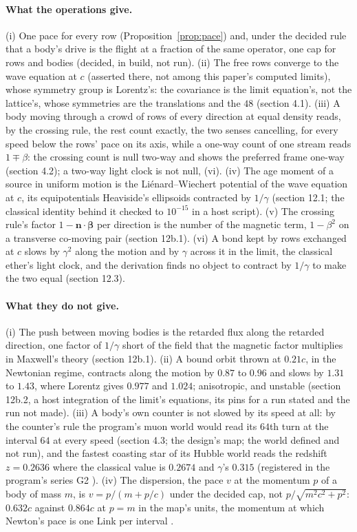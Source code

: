\documentclass[11pt]{article}
\theoremstyle{definition}
\begin{document}
\paragraph{What the operations give.} (i) One pace for every row
(Proposition~\ref{prop:pace}) and, under the decided rule that a body's
drive is the flight at a fraction of the same operator, one cap for rows
and bodies (decided, in build, not run). (ii) The free rows converge to
the wave equation at $c$ (asserted there, not among this paper's computed
limits), whose symmetry group is Lorentz's: the covariance is the limit
equation's, not the lattice's, whose symmetries are the translations and
the $48$ (section 4.1). (iii) A body moving through a crowd of rows of
every direction at equal density reads, by the crossing rule, the rest
count exactly, the two senses cancelling, for every speed below the rows'
pace on its axis, while a one-way count of one stream reads $1 \mp
\beta$: the crossing count is null two-way and shows the preferred frame
one-way (section 4.2); a two-way light clock is not null, (vi). (iv) The
age moment of a source in uniform motion is the Li\'enard--Wiechert
potential of the wave equation at $c$, its equipotentials Heaviside's
ellipsoids contracted by $1/\gamma$ (section 12.1; the classical identity
behind it checked to $10^{-15}$ in a host script). (v) The crossing
rule's factor $1 - \mathbf n \cdot \boldsymbol\beta$ per direction is the
number of the magnetic term, $1 - \beta^2$ on a transverse co-moving pair
(section 12b.1). (vi) A bond kept by rows exchanged at $c$ slows by
$\gamma^2$ along the motion and by $\gamma$ across it in the limit, the
classical ether's light clock, and the derivation finds no object to
contract by $1/\gamma$ to make the two equal (section 12.3).

\paragraph{What they do not give.} (i) The push between moving bodies is
the retarded flux along the retarded direction, one factor of $1/\gamma$
short of the field that the magnetic factor multiplies in Maxwell's
theory (section 12b.1). (ii) A bound orbit thrown at $0.21c$, in the
Newtonian regime, contracts along the motion by $0.87$ to $0.96$ and
slows by $1.31$ to $1.43$, where Lorentz gives $0.977$ and $1.024$;
anisotropic, and unstable (section 12b.2, a host integration of the
limit's equations, its pins for a run stated and the run not made).
(iii) A body's own counter is not slowed by its speed at all: by the
counter's rule the program's muon world would read its $64$th turn at the
interval $64$ at every speed (section 4.3; the design's map; the world
defined and not run), and the fastest coasting star of its Hubble world
reads the redshift $z = 0.2636$ where the classical value is $0.2674$ and $\gamma$'s
$0.315$ (registered in the program's series G2 \cite{register}). (iv)
The dispersion, the pace $v$ at the momentum $p$ of a body of mass $m$,
is $v = p/(m + p/c)$ under the decided cap, not
$p/\sqrt{m^2c^2 + p^2}$: $0.632c$ against $0.864c$ at $p = m$ in the
map's units, the momentum at which Newton's pace is one Link per
interval \cite{lightspeed}.
\end{document}
